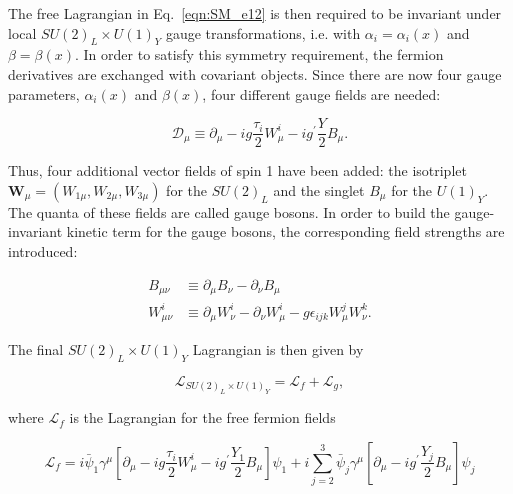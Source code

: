 The free Lagrangian in Eq.~\ref{eqn:SM_e12} is then required to be invariant under local $SU(2)_L\times U(1)_Y$ gauge transformations,
i.e. with $\alpha_i = \alpha_i(x)$ and $\beta = \beta(x)$.
In order to satisfy this symmetry requirement, the fermion derivatives are exchanged with covariant objects.
Since there are now four gauge parameters, $\alpha_i(x)$ and $\beta(x)$, four different gauge fields are needed:

\begin{equation}\label{eqn:SM_e16}
\mathcal{D}_\mu \equiv \partial_\mu - ig\frac{\tau_i}{2}W^i_\mu - ig^\prime \frac{Y}{2} B_\mu.
\end{equation}

Thus, four additional vector fields of spin 1 have been added: the isotriplet $\textbf{W}_\mu = (W_{1\mu}, W_{2\mu}, W_{3\mu})$ for the $SU(2)_L$ and the singlet $B_\mu$ for the $U(1)_Y$.
The quanta of these fields are called gauge bosons.
In order to build the gauge-invariant kinetic term for the gauge bosons, the corresponding field strengths are introduced: 

\begin{equation}\label{eqn:SM_e17}
\begin{split}
B_{\mu\nu} & \equiv \partial_\mu B_\nu - \partial_\nu B_\mu\\
W^i_{\mu\nu} & \equiv \partial_\mu W^i_\nu - \partial_\nu W^i_\mu - g\epsilon_{ijk} W^j_\mu W^k_\nu.
\end{split}
\end{equation}

The final $SU(2)_L \times U(1)_Y$ Lagrangian is then given by

\begin{equation}\label{eqn:SM_e18}
\mathcal{L}_{SU(2)_L\times U(1)_Y} = \mathcal{L}_f + \mathcal{L}_g,
\end{equation}

\noindent where $\mathcal{L}_f$ is the Lagrangian for the free fermion fields

\begin{equation}\label{eqn:SM_e19}
\mathcal{L}_f = i\bar{\psi}_1\gamma^\mu[\partial_\mu - ig\frac{\tau_i}{2}W^i_\mu - ig^\prime\frac{Y_1}{2}B_\mu]\psi_1 + i\sum_{j=2}^3\bar{\psi}_j\gamma^\mu[\partial_\mu - ig^\prime\frac{Y_j}{2}B_\mu]\psi_j
\end{equation}

